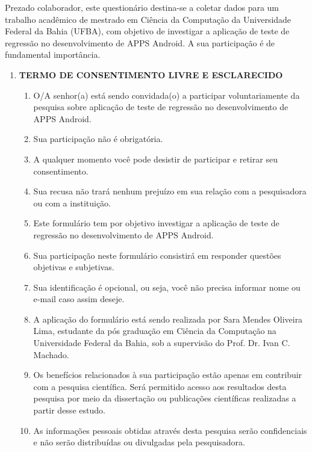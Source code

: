 \appendix
{}\label{sec:formulariopesquisa}

Prezado colaborador, este questionário destina-se a coletar dados para um trabalho acadêmico de mestrado em Ciência da Computação da Universidade Federal da Bahia (UFBA), com objetivo de investigar a aplicação de teste de regressão no desenvolvimento de \ac{APPS} Android. A sua participação é de fundamental importância.


\begin{enumerate}[label=\bf A\arabic*,leftmargin=1.8cm]

    \item \textbf{TERMO DE CONSENTIMENTO LIVRE E ESCLARECIDO}
    


    \begin{enumerate}[label= \arabic*]
        \item O/A senhor(a) está sendo convidada(o) a participar voluntariamente da pesquisa sobre aplicação de teste de regressão no desenvolvimento de \ac{APPS} Android.
        \item Sua participação não é obrigatória.
        \item A qualquer momento você pode desistir de participar e retirar seu consentimento.
        \item Sua recusa não trará nenhum prejuízo em sua relação com a pesquisadora ou com a instituição.
        \item Este formulário tem por objetivo investigar a aplicação de teste de regressão no desenvolvimento de \ac{APPS} Android.
        \item Sua participação neste formulário consistirá em responder questões objetivas e subjetivas.
        \item Sua identificação é opcional, ou seja, você não precisa informar nome ou e-mail caso assim deseje.
        \item A aplicação do formulário está sendo realizada por Sara Mendes Oliveira Lima, estudante da pós graduação em Ciência da Computação na Universidade Federal da Bahia, sob a supervisão do Prof. Dr. Ivan C. Machado.
        \item Os benefícios relacionados à sua participação estão apenas em contribuir com a pesquisa científica. Será permitido acesso aos resultados desta pesquisa por meio da dissertação ou publicações científicas realizadas a partir desse estudo.
        \item As informações pessoais obtidas através desta pesquisa serão confidenciais e não serão distribuídas ou divulgadas pela pesquisadora.

\end{enumerate}
\end{enumerate}

